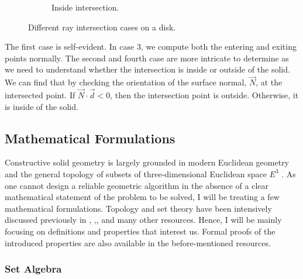 \documentclass[a4paper,11pt,oneside]{article}
\begin{document}
\begin{figure}[ht]
\begin{subfigure}[b]{0.4\textwidth}
		\caption{Inside intersection.}
		\label{sec3.1:inside-intersection}
	\end{subfigure}
	\caption{Different ray intersection cases on a disk.}
	\label{sec3.1:intersection-cases}
\end{figure}


The first case is self-evident. In case 3, we compute both the entering and exiting points normally. The second and fourth case are more intricate to determine as we need to understand whether the intersection is inside or outside of the solid. We can find that by checking the orientation of the surface normal, $\vec{N}$, at the intersected point. If $\vec{N}\cdot\vec{d} < 0$, then the intersection point is outside. Otherwise, it is inside of the solid.

\subsection{Mathematical Formulations}
  
Constructive solid geometry is largely grounded in modern Euclidean geometry and the general topology of subsets of three-dimensional Euclidean space $E^3$ \cite{Requicha1978MathematicalFO}. As one cannot design a reliable geometric algorithm in the absence of a clear mathematical statement of the problem to be solved, I will be treating a few mathematical formulations. Topology and set theory have been intensively discussed previously in \cite{Requicha1978MathematicalFO}, \cite{tilove1977a},\cite{lachlan_srebrny_zarach_1977}, and many other resources. Hence, I will be mainly focusing on definitions and properties that interest us. Formal proofs of the introduced properties are also available in the before-mentioned resources.
  
\subsubsection{Set Algebra}
  
\theoremstyle{definition}
\newtheorem{definition}{Definition}[section]
  
\theoremstyle{property}
\newtheorem{property}{Property}[section]
    
\theoremstyle{remark}
\newtheorem*{remark}{Remark}
      
\end{document}
